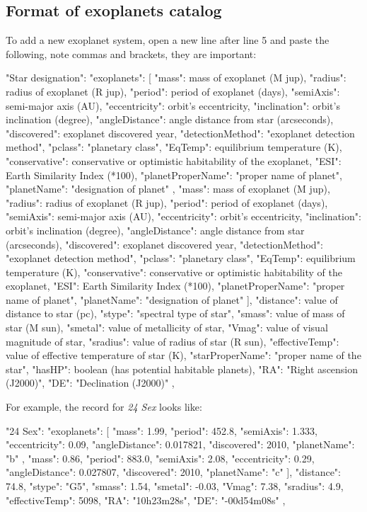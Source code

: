 \subsection{Format of exoplanets catalog}
\label{sec:plugins:Exoplanets:format}

To add a new exoplanet system, open a new line after line 5 and paste the following, note commas and brackets, they are important:

\begin{configfile}[\footnotesize]
"Star designation":
{
	"exoplanets":
	[
	{
		"mass": mass of exoplanet (M jup),
		"radius": radius of exoplanet (R jup),
		"period": period of exoplanet (days),
		"semiAxis": semi-major axis (AU),
		"eccentricity": orbit's eccentricity,
		"inclination": orbit's inclination (degree),
		"angleDistance": angle distance from star 
						(arcseconds),
		"discovered": exoplanet discovered year,
		"detectionMethod": "exoplanet detection method",
		"pclass": "planetary class",
		"EqTemp": equilibrium temperature (K),
		"conservative": conservative or optimistic 
				habitability of the exoplanet,
		"ESI": Earth Similarity Index (*100),
		"planetProperName": "proper name of planet",
		"planetName": "designation of planet"
	},
	{
		"mass": mass of exoplanet (M jup),
		"radius": radius of exoplanet (R jup),
		"period": period of exoplanet (days),
		"semiAxis": semi-major axis (AU),
		"eccentricity": orbit's eccentricity,
		"inclination": orbit's inclination (degree),
		"angleDistance": angle distance from star 
						(arcseconds),
		"discovered": exoplanet discovered year,
		"detectionMethod": "exoplanet detection method",
		"pclass": "planetary class",
		"EqTemp": equilibrium temperature (K),
		"conservative": conservative or optimistic 
				habitability of the exoplanet,
		"ESI": Earth Similarity Index (*100),
		"planetProperName": "proper name of planet",
		"planetName": "designation of planet"
	}
	],
	"distance": value of distance to star (pc),
	"stype": "spectral type of star",
	"smass": value of mass of star (M sun),
	"smetal": value of metallicity of star,
	"Vmag": value of visual magnitude of star,
	"sradius": value of radius of star (R sun),
	"effectiveTemp": value of effective temperature 
	                 of star (K),
	"starProperName": "proper name of the star",
	"hasHP": boolean (has potential habitable planets),
	"RA": "Right ascension (J2000)",
	"DE": "Declination (J2000)"
},
\end{configfile}

\noindent For example, the record for \textit{24 Sex} looks like:
\begin{configfile}[\footnotesize]
"24 Sex":
{
		"exoplanets":
		[
		{
			"mass": 1.99,
			"period": 452.8,
			"semiAxis": 1.333,
			"eccentricity": 0.09,
			"angleDistance": 0.017821,
			"discovered": 2010,
			"planetName": "b"
		},
		{
			"mass": 0.86,
			"period": 883.0,
			"semiAxis": 2.08,
			"eccentricity": 0.29,
			"angleDistance": 0.027807,
			"discovered": 2010,
			"planetName": "c"
		}
		],
		"distance": 74.8,
		"stype": "G5",
		"smass": 1.54,
		"smetal": -0.03,
		"Vmag": 7.38,
		"sradius": 4.9,
		"effectiveTemp": 5098,
		"RA": "10h23m28s",
		"DE": "-00d54m08s"
},
\end{configfile}


